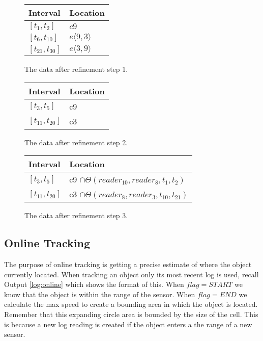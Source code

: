 \begin{figure}
\begin{minipage}[tbh]{\columnwidth}

  \vspace*{\fill}
  \centering
		\begin{tabular}{ l  l  }
		\toprule
		\textbf{Interval} & \textbf{Location}\\ 
		\midrule
		$[t_1,t_2]$ & $c9$ \\ 

		$[t_6,t_{10}]$ &  $e\langle9,3\rangle$\\ 

		$[t_{21},t_{30}]$ &  $ e\langle3,9\rangle $\\ 
		\bottomrule
		\end{tabular}
  \caption{The data after refinement step 1.}
  \label{fig:ref1} \par\vfill
	
	
		\begin{tabular}{  l  l  }
		\toprule
		\textbf{Interval} & \textbf{Location}\\ 
		\midrule
		$[t_3,t_5]$ & c9 \\ 

		$[t_{11},t_{20}]$ &  c3\\ 
		\bottomrule
		\end{tabular}
  \caption{The data after refinement step 2.}
  \label{fig:ref2}
	
		\begin{tabular}{  l  l  }
		\toprule
		\textbf{Interval} & \textbf{Location}\\ 
		\midrule
		$[t_3,t_5]$ & c9 $\cap \Theta(reader_10,reader_8,t_1,t_2)$ \\ 

		$[t_{11},t_{20}]$ &  c3 $\cap \Theta(reader_8,reader_3,t_{10},t_{21})$\\ 
		\hline
		\end{tabular}
			
	\caption{The data after refinement step 3.}
  \label{fig:ref3}

\end{minipage}
\end{figure}


\subsection{Online Tracking}
\label{sub:online}
The purpose of online tracking is getting a precise estimate of where the object currently located.
When tracking an object only its most recent log is used, recall Output \ref{log:online} which shows the format of this.
When $flag=START$ we know that the object is within the range of the sensor.
When $flag=END$ we calculate the max speed to create a bounding area in which the object is located. Remember that this expanding circle area is bounded by the size of the cell. 
This is because a new log reading is created if the object enters a the range of a new sensor.

